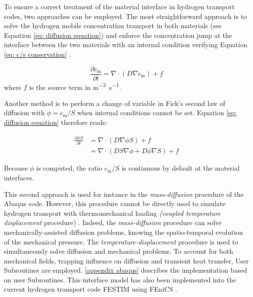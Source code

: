 To ensure a correct treatment of the material interface in hydrogen transport codes, two approaches can be employed.
The most straightforward approach is to solve the hydrogen mobile concentration transport in both materials (see Equation \ref{eq: diffusion equation}) and enforce the concentration jump at the interface between the two materials with an internal condition verifying  Equation \ref{eq: c/s conservation} .

\begin{equation}
    \frac{\partial c_\mathrm{m}}{\partial t}=\nabla \cdot\left(D \nabla c_\mathrm{m}\right) + f
   \label{eq: diffusion equation}
\end{equation}
where $f$ is the source term in \si{m^{-3}.s^{-1}}.

Another method is to perform a change of variable in Fick's second law of diffusion with $\phi = c_\mathrm{m}/S$  when internal conditions cannot be set.
Equation \ref{eq: diffusion equation} therefore reads:

\begin{align}
    \frac{\partial \phi S}{\partial t} &= \nabla \cdot\left(D \nabla \phi S\right) + f \nonumber \\
    &=\nabla \cdot\left( D S \nabla \phi + D \phi \nabla S\right) + f \label{eq: diffusion equation changed}
\end{align}

Because $\phi$ is computed, the ratio $c_\mathrm{m}/S$ is continuous by default at the material interfaces.

This second approach is used for instance in the \textit{mass-diffusion} procedure of the Abaqus code.
However, this procedure cannot be directly used to simulate hydrogen transport with thermomechanical loading \textit{(coupled temperature displacement} procedure) .
Indeed, the \textit{mass-diffusion} procedure can solve mechanically-assisted diffusion problems, knowing the spatio-temporal evolution of the mechanical pressure.
The \textit{temperature-displacement} procedure is used to simultaneously solve diffusion and mechanical problems.
To account for both mechanical fields, trapping influence on diffusion and transient heat transfer, User Subroutines are employed.
\ref{appendix abaqus} describes the implementation based on user Subroutines.
This interface model has also been implemented into the current hydrogen transport code FESTIM  using FEniCS .

